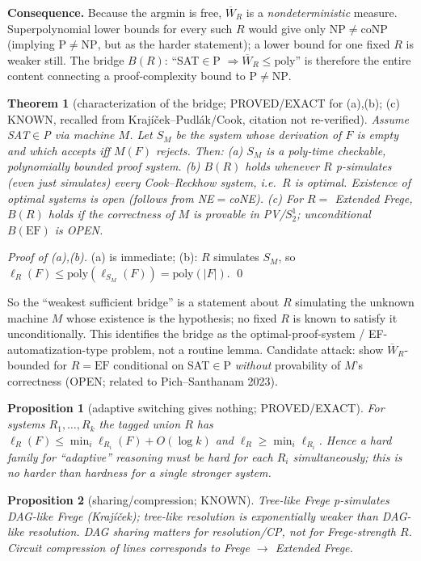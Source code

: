 \documentclass{article}
\newtheorem{thm}{Theorem}\newtheorem{prop}{Proposition}
\begin{document}
\noindent\textbf{Consequence.} Because the argmin is free, $\overline W_R$ is a \emph{nondeterministic} measure. Superpolynomial lower bounds for every such $R$ would give only $\mathrm{NP}\ne\mathrm{coNP}$ (implying $\mathrm P\neq\mathrm{NP}$, but as the harder statement); a lower bound for one fixed $R$ is weaker still. The bridge $B(R)$: ``SAT$\in$P $\Rightarrow\overline W_R\le\mathrm{poly}$'' is therefore the entire content connecting a proof-complexity bound to $\mathrm P\ne\mathrm{NP}$.
\begin{thm}[characterization of the bridge; PROVED/EXACT for (a),(b); (c) KNOWN, recalled from Krajíček--Pudlák/Cook, citation not re-verified]\label{t2}
Assume SAT$\in$P via machine $M$. Let $S_M$ be the system whose derivation of $F$ is empty and which accepts iff $M(F)$ rejects. Then:
(a) $S_M$ is a poly-time checkable, polynomially bounded proof system.
(b) $B(R)$ holds whenever $R$ p-simulates (even just simulates) every Cook--Reckhow system, i.e.\ $R$ is optimal. Existence of optimal systems is open (follows from NE$=$coNE).
(c) For $R=$ Extended Frege, $B(R)$ holds if the correctness of $M$ is provable in PV/$S^1_2$; unconditional $B(\mathrm{EF})$ is OPEN.
\end{thm}
\emph{Proof of (a),(b).} (a) is immediate; (b): $R$ simulates $S_M$, so $\ell_R(F)\le\mathrm{poly}(\ell_{S_M}(F))=\mathrm{poly}(|F|)$. \qed

\noindent So the ``weakest sufficient bridge'' is a statement about $R$ simulating the unknown machine $M$ whose existence is the hypothesis; no fixed $R$ is known to satisfy it unconditionally. This identifies the bridge as the optimal-proof-system / EF-automatization-type problem, not a routine lemma. Candidate attack: show $\overline{W}_R$-bounded for $R=\mathrm{EF}$ conditional on SAT$\in$P \emph{without} provability of $M$'s correctness (OPEN; related to Pich--Santhanam 2023).
\begin{prop}[adaptive switching gives nothing; PROVED/EXACT]\label{p2}
For systems $R_1,\dots,R_k$ the tagged union $R$ has $\ell_R(F)\le\min_i\ell_{R_i}(F)+O(\log k)$ and $\ell_R\ge\min_i\ell_{R_i}$. Hence a hard family for ``adaptive'' reasoning must be hard for each $R_i$ simultaneously; this is no harder than hardness for a single stronger system.
\end{prop}
\begin{prop}[sharing/compression; KNOWN]\label{p3}
Tree-like Frege p-simulates DAG-like Frege (Krajíček); tree-like resolution is exponentially weaker than DAG-like resolution. DAG sharing matters for resolution/CP, not for Frege-strength $R$. Circuit compression of lines corresponds to Frege $\to$ Extended Frege.
\end{prop}
\end{document}
